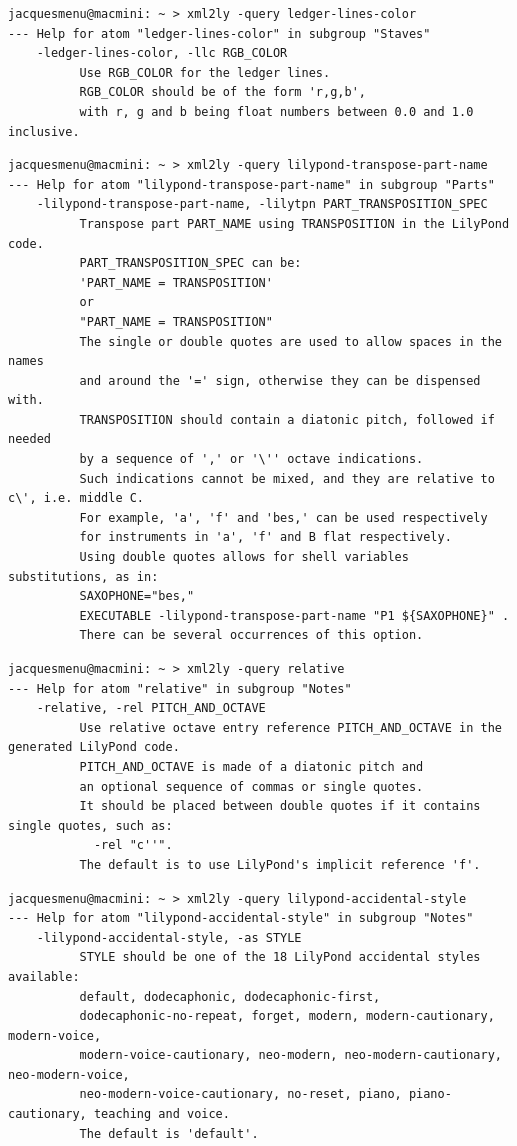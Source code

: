 \begin{lstlisting}[language=Terminal]
jacquesmenu@macmini: ~ > xml2ly -query ledger-lines-color
--- Help for atom "ledger-lines-color" in subgroup "Staves"
    -ledger-lines-color, -llc RGB_COLOR
          Use RGB_COLOR for the ledger lines.
          RGB_COLOR should be of the form 'r,g,b',
          with r, g and b being float numbers between 0.0 and 1.0 inclusive.
\end{lstlisting}

\begin{lstlisting}[language=Terminal]
jacquesmenu@macmini: ~ > xml2ly -query lilypond-transpose-part-name
--- Help for atom "lilypond-transpose-part-name" in subgroup "Parts"
    -lilypond-transpose-part-name, -lilytpn PART_TRANSPOSITION_SPEC
          Transpose part PART_NAME using TRANSPOSITION in the LilyPond code.
          PART_TRANSPOSITION_SPEC can be:
          'PART_NAME = TRANSPOSITION'
          or
          "PART_NAME = TRANSPOSITION"
          The single or double quotes are used to allow spaces in the names
          and around the '=' sign, otherwise they can be dispensed with.
          TRANSPOSITION should contain a diatonic pitch, followed if needed
          by a sequence of ',' or '\'' octave indications.
          Such indications cannot be mixed, and they are relative to c\', i.e. middle C.
          For example, 'a', 'f' and 'bes,' can be used respectively
          for instruments in 'a', 'f' and B flat respectively.
          Using double quotes allows for shell variables substitutions, as in:
          SAXOPHONE="bes,"
          EXECUTABLE -lilypond-transpose-part-name "P1 ${SAXOPHONE}" .
          There can be several occurrences of this option.
\end{lstlisting}

\begin{lstlisting}[language=Terminal]
jacquesmenu@macmini: ~ > xml2ly -query relative
--- Help for atom "relative" in subgroup "Notes"
    -relative, -rel PITCH_AND_OCTAVE
          Use relative octave entry reference PITCH_AND_OCTAVE in the generated LilyPond code.
          PITCH_AND_OCTAVE is made of a diatonic pitch and
          an optional sequence of commas or single quotes.
          It should be placed between double quotes if it contains single quotes, such as:
            -rel "c''".
          The default is to use LilyPond's implicit reference 'f'.
\end{lstlisting}

\begin{lstlisting}[language=Terminal]
jacquesmenu@macmini: ~ > xml2ly -query lilypond-accidental-style
--- Help for atom "lilypond-accidental-style" in subgroup "Notes"
    -lilypond-accidental-style, -as STYLE
          STYLE should be one of the 18 LilyPond accidental styles available:
          default, dodecaphonic, dodecaphonic-first,
          dodecaphonic-no-repeat, forget, modern, modern-cautionary, modern-voice,
          modern-voice-cautionary, neo-modern, neo-modern-cautionary, neo-modern-voice,
          neo-modern-voice-cautionary, no-reset, piano, piano-cautionary, teaching and voice.
          The default is 'default'.
\end{lstlisting}

